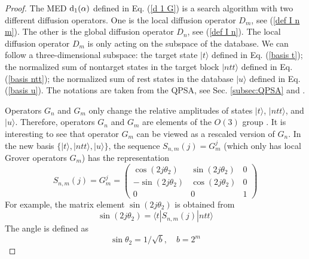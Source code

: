 \documentclass[%
 twocolumn,
 10pt,
 superscriptaddress,
 longbibliography,
 amsmath,amssymb,
 aps,
 pra,
floatfix,
]{revtex4-1}
\begin{document}
\begin{proof}
The MED $\text d_1(\alpha)$ defined in Eq. (\ref{d 1 G}) is a search algorithm with two different diffusion operators. One is the local diffusion operator $D_m$, see (\ref{def I n m}). The other is the global diffusion operator $D_n$, see (\ref{def I n}). The local diffusion operator $D_m$ is only acting on the subspace of the database. We can follow a three-dimensional subspace: the target state $|t\rangle$ defined in Eq. (\ref{basis t}); the normalized sum of nontarget states in the target block $|ntt\rangle$ defined in Eq. (\ref{basis ntt}); the normalized sum of rest states in the database $|u\rangle$ defined in Eq. (\ref{basis u}). The notations are taken from the QPSA, see Sec. \ref{subsec:QPSA} and \cite{Korepin05,KG06}.

Operators $G_n$ and $G_m$ only change the relative amplitudes of states $|t\rangle$, $|ntt\rangle$, and $|u\rangle$. Therefore, operators $G_n$ and $G_m$ are elements of the $O(3)$ group \cite{KV06}. It is interesting to see that operator $G_m$ can be viewed as a rescaled version of $G_n$. In the new basis $\{|t\rangle,|ntt\rangle,|u\rangle\}$, the sequence $S_{n,m}(j)=G^j_m$ (which only has local Grover operators $G_m$) has the representation
\begin{equation}
    S_{n,m}(j)=G^j_m=\left(\begin{array}{ccc}
	  \cos(2j\theta_2)	& \sin(2j\theta_2) &  0\\ 
	-\sin(2j\theta_2)	& \cos(2j\theta_2) &  0\\ 
	0	& 0 & 1
	\end{array} 
	\right)
\end{equation}
For example, the matrix element $\sin(2j\theta_2)$ is obtained from
\begin{equation}
    \sin(2j\theta_2) = \langle t|S_{n,m}(j)|ntt\rangle
\end{equation}
The angle is defined as 
\begin{equation}
    \sin\theta_2 = 1/\sqrt b,\quad b=2^m
\end{equation}


\end{proof}
\end{document}
